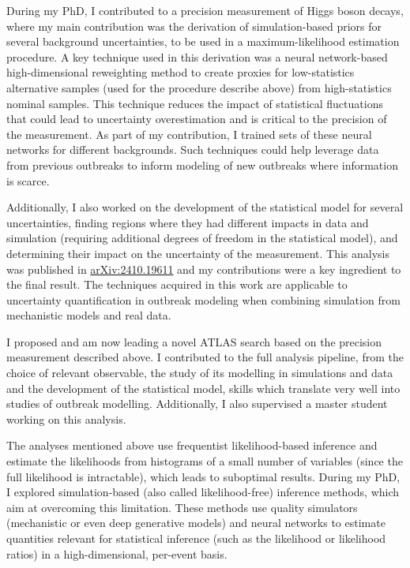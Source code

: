 \documentclass[11pt, a4paper]{awesome-cv}
\begin{document}
\begin{cvletter}
During my PhD, I contributed to a precision measurement of Higgs boson decays, where my main contribution was the derivation of simulation-based priors for several background uncertainties, to be used in a maximum-likelihood estimation procedure. A key technique used in this derivation was a neural network-based high-dimensional reweighting method to create proxies for low-statistics alternative samples (used for the procedure describe above) from high-statistics nominal samples. This technique reduces the impact of statistical fluctuations that could lead to uncertainty overestimation and is critical to the precision of the measurement. As part of my contribution, I trained sets of these neural networks for different backgrounds. Such techniques could help leverage data from previous outbreaks to inform modeling of new outbreaks where information is scarce.

Additionally, I also worked on the development of the statistical model for several uncertainties, finding regions where they had different impacts in data and simulation (requiring additional degrees of freedom in the statistical model), and determining their impact on the uncertainty of the measurement. This analysis was published in \href{https://arxiv.org/abs/2410.19611}{arXiv:2410.19611} and my contributions were a key ingredient to the final result. The techniques acquired in this work are applicable to uncertainty quantification in outbreak modeling when combining simulation from mechanistic models and real data.

I proposed and am now leading a novel ATLAS search based on the precision measurement described above. I contributed to the full analysis pipeline, from the choice of relevant observable, the study of its modelling in simulations and data and the development of the statistical model, skills which translate very well into studies of outbreak modelling. Additionally, I also supervised a master student working on this analysis.


The analyses mentioned above use frequentist likelihood-based inference and estimate the likelihoods from histograms of a small number of variables (since the full likelihood is intractable), which leads to suboptimal results. During my PhD, I explored simulation-based (also called likelihood-free) inference methods, which aim at overcoming this limitation. These methods use quality simulators (mechanistic or even deep generative models) and neural networks to estimate quantities relevant for statistical inference (such as the likelihood or likelihood ratios) in a high-dimensional, per-event basis.


\end{cvletter}
\end{document}
